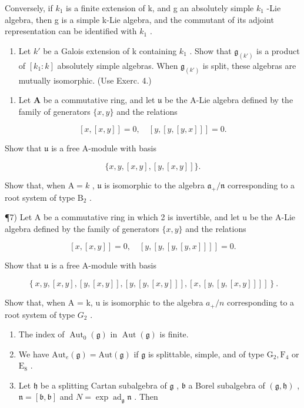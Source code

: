 Conversely, if \(k_{1}\) is a finite extension of k, and g an absolutely simple \(k_{1}\) -Lie algebra, then g is a simple k-Lie algebra, and the commutant of its adjoint representation can be identified with \(k_{1}\) .

\begin{enumerate}
\def\labelenumi{\alph{enumi})}
\setcounter{enumi}{1}
\tightlist
\item
  Let \(k'\) be a Galois extension of k containing \(k_{1}\) . Show that \(\mathfrak{g}_{(k')}\) is a product of \([k_{1}:k]\) absolutely simple algebras. When \(\mathfrak{g}_{(k')}\) is split, these algebras are mutually isomorphic. (Use Exerc. 4.)
\end{enumerate}

\begin{enumerate}
\def\labelenumi{\arabic{enumi})}
\setcounter{enumi}{5}
\tightlist
\item
  Let \(\mathbf{A}\) be a commutative ring, and let \(\mathfrak{u}\) be the A-Lie algebra defined by the family of generators \(\{x, y\}\) and the relations
\end{enumerate}

\[
[ x, [ x, y ] ] = 0, \quad [ y, [ y, [ y, x ] ] ] = 0.
\]

Show that \(\mathfrak{u}\) is a free A-module with basis

\[
\{x, y, [ x, y ], [ y, [ x, y ] ] \}.
\]

Show that, when \(\mathrm{A} = k\) , \(\mathfrak{u}\) is isomorphic to the algebra \(\mathfrak{a}_{+} / \mathfrak{n}\) corresponding to a root system of type \(\mathrm{B}_2\) .

¶7) Let A be a commutative ring in which 2 is invertible, and let u be the A-Lie algebra defined by the family of generators \(\{x,y\}\) and the relations

\[
[ x, [ x, y ] ] = 0, \quad [ y, [ y, [ y, [ y, x ] ] ] ] = 0.
\]

Show that \(\mathfrak{u}\) is a free A-module with basis

\[
\left. \right.\left\{x, y, [ x, y ], [ y, [ x, y ] ], [ y, [ y, [ x, y ] ] ], [ x, [ y, [ y, [ x, y ] ] ] ] \right\}.
\]

Show that, when A = k, u is isomorphic to the algebra \(a_{+}/n\) corresponding to a root system of type \(G_{2}\) .


\begin{enumerate}
\def\labelenumi{\arabic{enumi})}
\item
  The index of \(\operatorname{Aut}_{0}(\mathfrak{g})\) in \(\operatorname{Aut}(\mathfrak{g})\) is finite.
\item
  We have \(\mathrm{Aut}_e(\mathfrak{g}) = \mathrm{Aut}(\mathfrak{g})\) if \(\mathfrak{g}\) is splittable, simple, and of type \(\mathrm{G}_2, \mathrm{F}_4\) or \(\mathrm{E}_8\) .
\item
  Let \(\mathfrak{h}\) be a splitting Cartan subalgebra of \(\mathfrak{g}\) , \(\mathfrak{b}\) a Borel subalgebra of \((\mathfrak{g},\mathfrak{h})\) , \(\mathfrak{n} = [\mathfrak{b},\mathfrak{b}]\) and \(N = \exp \operatorname{ad}_{\mathfrak{g}}\mathfrak{n}\) . Then
\end{enumerate}

